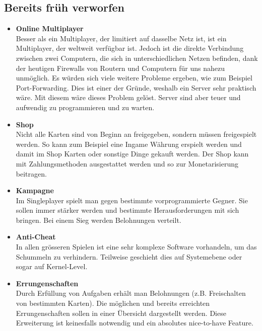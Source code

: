 \subsection{Bereits früh verworfen}
\begin{itemize}
    \item \textbf{\gls{Online} Multiplayer} \\
        Besser als ein Multiplayer, der limitiert auf dasselbe Netz ist, ist ein Multiplayer, der weltweit verfügbar ist. Jedoch ist die direkte Verbindung zwischen zwei Computern, die sich in unterschiedlichen Netzen befinden, dank der heutigen \glspl{Firewall} von Routern und Computern für uns nahezu unmöglich. 
        Es würden sich viele weitere Probleme ergeben, wie zum Beispiel Port-Forwarding. Dies ist einer der Gründe, weshalb ein Server sehr praktisch wäre. Mit diesem wäre dieses
        Problem gelöst. Server sind aber teuer und aufwendig zu programmieren und zu warten. 
    \item \textbf{\gls{Shop}} \\
        Nicht alle Karten sind von Beginn an freigegeben, sondern müssen freigespielt werden.
        So kann zum Beispiel eine Ingame Währung erspielt werden und damit im Shop Karten oder sonstige Dinge gekauft werden.
        Der Shop kann mit Zahlungsmethoden ausgestattet werden und so zur Monetarisierung beitragen.
    \item \textbf{Kampagne} \\
        Im Singleplayer spielt man gegen bestimmte vorprogrammierte Gegner. Sie sollen immer stärker werden und bestimmte Herausforderungen mit sich bringen.
        Bei einem Sieg werden Belohnungen verteilt.
    \item \textbf{\gls{Anti-Cheat}} \\
        In allen grösseren Spielen ist eine sehr komplexe Software vorhandeln, um das Schummeln zu verhindern.
        Teilweise geschieht dies auf Systemebene oder sogar auf Kernel-Level.
    \item \textbf{Errungenschaften} \\
        Durch Erfüllung von Aufgaben erhält man Belohnungen (z.B. Freischalten von bestimmten Karten). 
        Die möglichen und bereits erreichten Errungenschaften sollen in einer Übersicht dargestellt werden. 
        Diese Erweiterung ist keinesfalls notwendig und ein absolutes nice-to-have Feature.
\end{itemize} 

